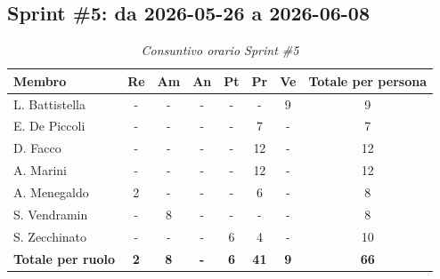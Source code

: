 \documentclass[a4paper, 10pt, colorlinks=true, linkcolor=black, urlcolor=blue, citecolor=blue, hidelinks]{article}
\renewcommand{\arraystretch}{1.2}
\begin{document}
\subsection{Sprint \#5: da 2026-05-26 a 2026-06-08}

\begin{table}[H]
    \centering
    \renewcommand{\arraystretch}{1.4}
    \begin{tabular}{|l|c|c|c|c|c|c|c|}
        \hline
        \rowcolor{bluBitless!15}
        \textbf{Membro} & \textbf{Re} & \textbf{Am} & \textbf{An} & \textbf{Pt} & \textbf{Pr} & \textbf{Ve} & \textbf{Totale per persona} \\
        \hline
        L. Battistella & - & - & - & - & - & 9 & 9 \\ \hline
        E. De Piccoli & - & - & - & - & 7 & - & 7 \\ \hline
        D. Facco & - & - & - & - & 12 & - & 12 \\ \hline
        A. Marini & - & - & - & - & 12 & - & 12 \\ \hline
        A. Menegaldo & 2 & - & - & - & 6 & - & 8 \\ \hline
        S. Vendramin & - & 8 & - & - & - & - & 8 \\ \hline
        S. Zecchinato & - & - & - & 6 & 4 & - & 10 \\ \hline
        \rowcolor{bluBitless!8}
        \textbf{Totale per ruolo} & \textbf{2} & \textbf{8} & \textbf{-} & \textbf{6} & \textbf{41} & \textbf{9} & \textbf{66} \\
        \hline
    \end{tabular}
    \caption{\textit{Consuntivo orario Sprint \#5}}
\end{table}
\end{document}

